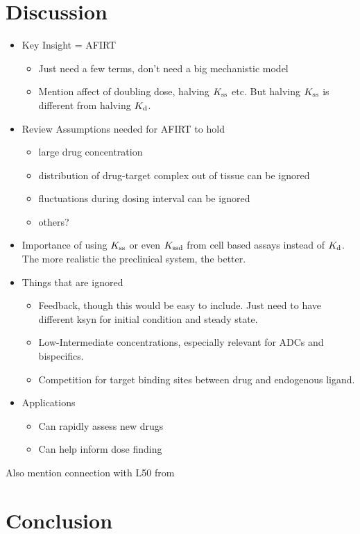 \section{Discussion}

\begin{itemize}
\item Key Insight = AFIRT
	\begin{itemize}
		\item Just need a few terms, don't need a big mechanistic model
		\item Mention affect of doubling dose, halving $K_\text{ss}$ etc.
			\subitem But halving $K_\text{ss}$ is different from halving $K_\text{d}$.
	\end{itemize}
\item Review Assumptions needed for AFIRT to hold
	\begin{itemize}
		\item large drug concentration
		\item distribution of drug-target complex out of tissue can be ignored
		\item fluctuations during dosing interval can be ignored
		\item others?
	\end{itemize}
\item Importance of using $K_\text{ss}$ or even $K_\text{ssd}$ from cell based assays instead of $K_\text{d}$.  The more realistic the preclinical system, the better.
\item Things that are ignored
	\begin{itemize}
		\item Feedback, though this would be easy to include.  Just need to have different ksyn for initial condition and steady state.
		\item Low-Intermediate concentrations, especially relevant for ADCs and bispecifics.
		\item Competition for target binding sites between drug and endogenous ligand.
	\end{itemize}
\item Applications
	\begin{itemize}
		\item Can rapidly assess new drugs
		\item Can help inform dose finding
	\end{itemize}
\end{itemize}

Also mention connection with L50 from \cite{gabrielsson17}

\section{Conclusion}